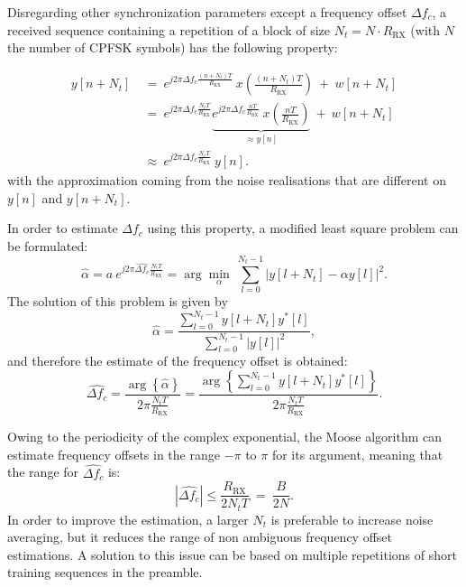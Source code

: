 Disregarding other synchronization parameters except a frequency offset $\Delta f_c$, a received sequence containing a repetition of a block of size $N_t=N\cdot R_{\text{RX}}$ (with $N$ the number of CPFSK symbols) has the following property:

\begin{align*}
    y[n+N_t] \:&=\:e^{j2\pi \Delta f_c \frac{(n+N_t)T}{R_{\text{RX}}}} \:x\left(\frac{(n+N_t)T}{R_{\text{RX}}}\right) \:+\: w[n+N_t]\\
    &=\:e^{j2\pi \Delta f_c \frac{N_tT}{R_{\text{RX}}}} \underbrace{e^{j2\pi \Delta f_c \frac{nT}{R_{\text{RX}}}}\:x\left(\frac{nT}{R_{\text{RX}}}\right)}_{\approx y[n]} \:+\: w[n+N_t]\\
    &\approx \:e^{j2\pi \Delta f_c \frac{N_tT}{R_{\text{RX}}}}\: y[n].
\end{align*}
with the approximation coming from the noise realisations that are different on $y[n]$ and $y[n+N_t]$.

In order to estimate $\Delta f_c$ using this property, a modified least square problem can be formulated:
\begin{equation*}
    \hat{\alpha} = a \:e^{j2\pi \widehat{\Delta f_c} \frac{N_tT}{R_{\text{RX}}}} = \arg\min_{\alpha} \: \sum_{l=0}^{N_t-1} \left|y[l+N_t] - \alpha y[l]\right|^2.
\end{equation*}
The solution of this problem is given by
\begin{equation*}
    \hat{\alpha} =  \frac{\sum_{l=0}^{N_t-1} y[l+N_t]y^*[l]}{\sum_{l=0}^{N_t-1} |y[l]|^2},
\end{equation*}
and therefore the estimate of the frequency offset is obtained:
\begin{equation*}
     \widehat{\Delta f_c} = \frac{\arg\left\{\hat{\alpha}\right\}}{2 \pi \frac{N_tT}{R_{\text{RX}}}} = \frac{\arg\left\{\sum_{l=0}^{N_t-1} y[l+N_t]y^*[l]\right\}}{2 \pi \frac{N_tT}{R_{\text{RX}}}}.
\end{equation*}

Owing to the periodicity of the complex exponential, the Moose algorithm can estimate frequency offsets in the range $-\pi$ to $\pi$ for its argument, meaning that the range for $\widehat{\Delta f_c}$ is:
\begin{equation*}
    |\widehat{\Delta f_c}| \leq \frac{R_{\text{RX}}}{2N_tT}\:=\:\frac{B}{2N}.
\end{equation*}
In order to improve the estimation, a larger $N_t$ is preferable to increase noise averaging, but it reduces the range of non ambiguous frequency offset estimations. A solution to this issue can be based on multiple repetitions of short training sequences in the preamble.

